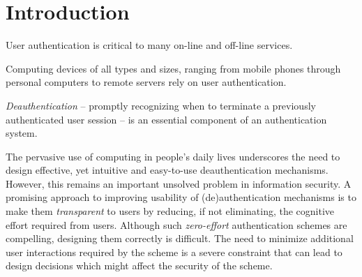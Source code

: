 \documentclass[conference]{IEEEtran}
\newcommand{\zebra}{ZEBRA\xspace}
\newif\ifabridged
\begin{document}
\begin{abstract} 
	
	
	Deauthentication is an important component of any authentication
	system. The widespread use of computing devices in daily life has
	underscored the need for \textit{zero-effort} deauthentication schemes.
	However, the quest for eliminating user effort may lead to hidden
	security flaws \ifabridged \else in the authentication schemes\fi. 

As a case in point, we investigate a prominent zero-effort deauthentication
scheme, called \zebra, which provides an interesting and a useful solution to a
difficult problem as demonstrated in the original paper. We identify a subtle
incorrect assumption in its adversary model that leads to a fundamental design flaw. We
exploit this to break the scheme with a class of attacks that are much easier
for a human to perform in a realistic adversary
model, compared to the na\"{i}ve attacks studied in the \zebra paper. For
example, one of our main attacks, where the human attacker has to opportunistically
mimic only the victim's keyboard typing activity at a nearby terminal, is
significantly more successful compared to the na\"{i}ve attack
that requires mimicking keyboard and mouse activities as well as keyboard-mouse movements.
Further, by understanding the design flaws in \zebra as cases of \textit{tainted
  input}, we show that we can draw on well-understood design principles to
  improve \zebra's security. 
  
  \end{abstract}


 
\section{Introduction}
\label{sec:intro}

User authentication is critical to many on-line and off-line services. 
\ifabridged
\else
Computing devices of all types and sizes,
ranging from mobile phones through personal computers to remote
servers rely on user authentication.  
\fi
\textit{Deauthentication} --
promptly recognizing when to terminate a previously authenticated user
session -- is an essential component of an authentication system.
\ifabridged
\else


\fi
The pervasive use of computing in people's daily lives underscores the
need to design effective, yet intuitive and easy-to-use deauthentication
mechanisms. However, this remains an important unsolved problem in
information security. A promising approach to improving usability
of (de)authentication mechanisms is to make them \textit{transparent} to
users by reducing, if not eliminating, the cognitive effort required
from users.  Although such \textit{zero-effort} authentication schemes
are compelling, designing them correctly is difficult. The need
to minimize additional user interactions required by the
scheme is a severe constraint that can lead to design
decisions which might affect the security of the scheme.
\end{document}
